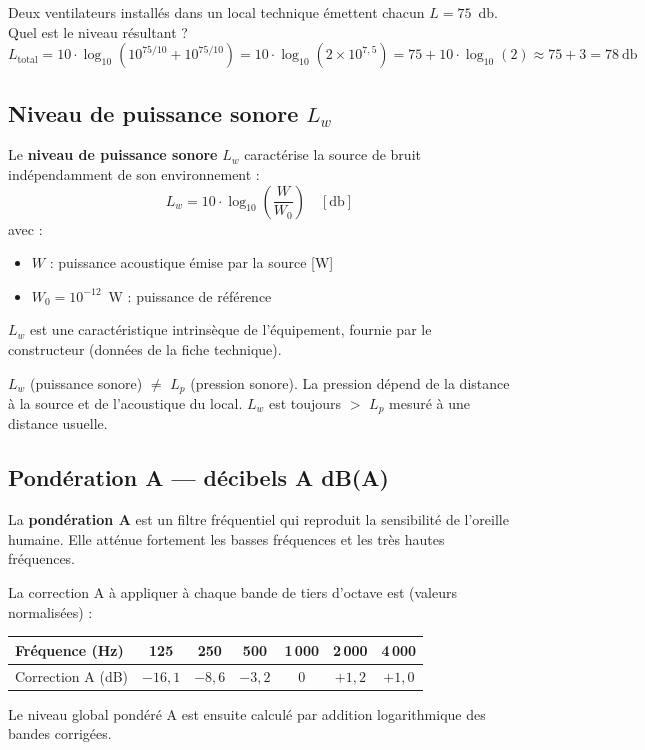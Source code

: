 \begin{exemple}
Deux ventilateurs installés dans un local technique émettent chacun $L = 75$~\si{\decibel}. Quel est le niveau résultant ?
\[
  L_{\text{total}} = 10 \cdot \log_{10}(10^{75/10} + 10^{75/10}) = 10 \cdot \log_{10}(2 \times 10^{7{,}5}) = 75 + 10 \cdot \log_{10}(2) \approx 75 + 3 = 78~\si{\decibel}
\]
\end{exemple}

\subsection{Niveau de puissance sonore \texorpdfstring{$L_w$}{Lw}}

\begin{definition}
Le \textbf{niveau de puissance sonore} $L_w$ caractérise la source de bruit indépendamment de son environnement :
\[
  L_w = 10 \cdot \log_{10}\!\left(\frac{W}{W_0}\right) \quad [\si{\decibel}]
\]
avec :
\begin{itemize}
  \item $W$ : puissance acoustique émise par la source [\si{\watt}]
  \item $W_0 = 10^{-12}$~\si{\watt} : puissance de référence
\end{itemize}
$L_w$ est une caractéristique intrinsèque de l'équipement, fournie par le constructeur (données de la fiche technique).
\end{definition}

\begin{attention}
$L_w$ (puissance sonore) $\neq$ $L_p$ (pression sonore). La pression dépend de la distance à la source et de l'acoustique du local. $L_w$ est toujours $>$ $L_p$ mesuré à une distance usuelle.
\end{attention}

\subsection{Pondération A — décibels A \texorpdfstring{dB(A)}{dB(A)}}

\begin{definition}
La \textbf{pondération A} est un filtre fréquentiel qui reproduit la sensibilité de l'oreille humaine. Elle atténue fortement les basses fréquences et les très hautes fréquences.

La correction A à appliquer à chaque bande de tiers d'octave est (valeurs normalisées) :

\begin{center}
\begin{tabular}{lcccccc}
\toprule
Fréquence (Hz) & 125 & 250 & 500 & 1\,000 & 2\,000 & 4\,000 \\
\midrule
Correction A (dB) & $-16{,}1$ & $-8{,}6$ & $-3{,}2$ & $0$ & $+1{,}2$ & $+1{,}0$ \\
\bottomrule
\end{tabular}
\end{center}

Le niveau global pondéré A est ensuite calculé par addition logarithmique des bandes corrigées.
\end{definition}

